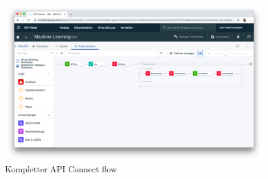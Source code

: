 \begin{figure}[h]
    \centering
    \includegraphics[scale=0.26]{images/kapitel_3/api_connect.png}
    \caption{Kompletter API Connect flow}
    \label{fig:umsetzung_api_connect}
\end{figure}